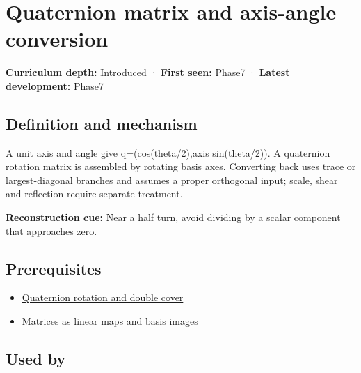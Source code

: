 \hypertarget{appendix-26d8da71f6c4}{}\label{referencestart:appendix-26d8da71f6c4}
\section{Quaternion matrix and axis-angle conversion}\label{appendix-26d8da71f6c4-quaternion-matrix-and-axis-angle-conversion}

\hypertarget{appendix-26d8da71f6c4-quaternion-matrix-and-axis-angle-conversion}{}

\textbf{Curriculum depth:} Introduced · \textbf{First seen:} Phase7 · \textbf{Latest development:} Phase7

\begin{allmightroledefinition}

\subsection{Definition and mechanism}\label{appendix-26d8da71f6c4-definition-and-mechanism}

\hypertarget{appendix-26d8da71f6c4-definition-and-mechanism}{}

A unit axis and angle give q=(cos(theta/2),axis sin(theta/2)). A quaternion rotation matrix is assembled by rotating basis axes. Converting back uses trace or largest-diagonal branches and assumes a proper orthogonal input; scale, shear and reflection require separate treatment.

\end{allmightroledefinition}

\textbf{Reconstruction cue:} Near a half turn, avoid dividing by a scalar component that approaches zero.

\subsection{Prerequisites}\label{appendix-26d8da71f6c4-prerequisites}

\hypertarget{appendix-26d8da71f6c4-prerequisites}{}

\begin{itemize}
\tightlist
\item
  \hyperref[appendix-8e61ab68f6b2]{Quaternion rotation and double cover}
\item
  \hyperref[appendix-bd39c3bf5d64]{Matrices as linear maps and basis images}
\end{itemize}

\subsection{Used by}\label{appendix-26d8da71f6c4-used-by}

